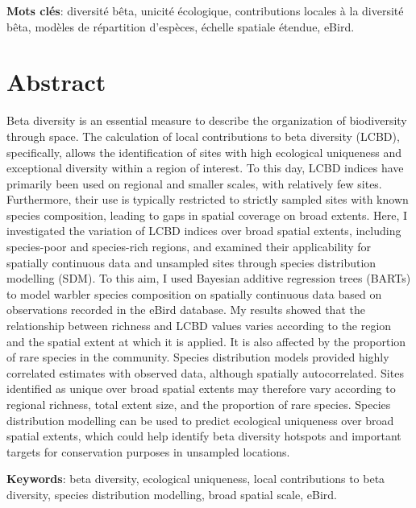 \documentclass[12pt,twoside,maitrise]{x_template}
\begin{document}
\textbf{Mots clés}: diversité bêta, unicité écologique, contributions locales à la diversité bêta, modèles de répartition d'espèces, échelle spatiale étendue, eBird.


\anglais
\chapter*{Abstract}

Beta diversity is an essential measure to describe the organization of biodiversity through space. The calculation of local contributions to beta diversity (LCBD), specifically, allows the identification of sites with high ecological uniqueness and exceptional diversity within a region of interest. To this day, LCBD indices have primarily been used on regional and smaller scales, with relatively few sites. Furthermore, their use is typically restricted to strictly sampled sites with known species composition, leading to gaps in spatial coverage on broad extents. Here, I investigated the variation of LCBD indices over broad spatial extents, including species-poor and species-rich regions, and examined their applicability for spatially continuous data and unsampled sites through species distribution modelling (SDM). To this aim, I used Bayesian additive regression trees (BARTs) to model warbler species composition on spatially continuous data based on observations recorded in the eBird database. My results showed that the relationship between richness and LCBD values varies according to the region and the spatial extent at which it is applied. It is also affected by the proportion of rare species in the community. Species distribution models provided highly correlated estimates with observed data, although spatially autocorrelated. Sites identified as unique over broad spatial extents may therefore vary according to regional richness, total extent size, and the proportion of rare species. Species distribution modelling can be used to predict ecological uniqueness over broad spatial extents, which could help identify beta diversity hotspots and important targets for conservation purposes in unsampled locations.

\textbf{Keywords}: beta diversity, ecological uniqueness, local contributions to beta diversity, species distribution modelling, broad spatial scale, eBird.
\end{document}

